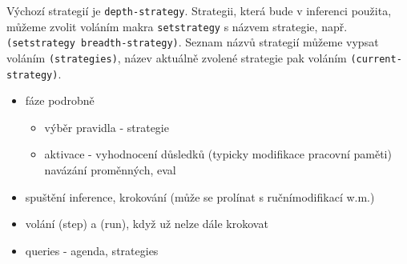 Výchozí strategií je \verb|depth-strategy|. Strategii, která bude v inferenci
použita, můžeme zvolit voláním makra \verb|setstrategy| s názvem strategie,
např. \verb|(setstrategy breadth-strategy)|. Seznam názvů strategií můžeme
vypsat voláním \verb|(strategies)|, název aktuálně zvolené strategie pak voláním
\verb|(current-strategy)|.

\begin{framed}
  \begin{itemize}
    \item fáze podrobně
    \begin{itemize}
      \item výběr pravidla - strategie
      \item aktivace - vyhodnocení důsledků (typicky modifikace pracovní paměti)
        navázání proměnných, eval
    \end{itemize}
    \item spuštění inference, krokování (může se prolínat s ručnímodifikací w.m.)
    \item volání (step) a (run), když už nelze dále krokovat
    \item queries - agenda, strategies
  \end{itemize}
\end{framed}
